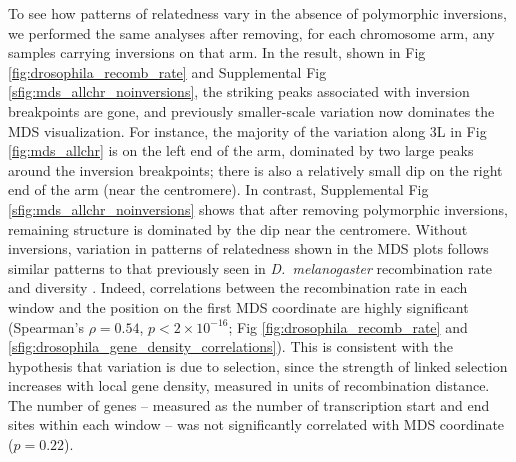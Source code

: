 \documentclass[11pt, oneside]{article}   	%
\newcommand\citep{\cite}
\newcommand{\Figure}{Fig }
\newcommand{\Figures}{Fig }
\newcommand{\Figure}{{Figure }}
\newcommand{\Figures}{{Figures }}
\begin{document}
To see how patterns of relatedness vary in the absence of polymorphic inversions,
we performed the same analyses after removing, for each chromosome arm,
any samples carrying inversions on that arm.
In the result, shown in \Figure \ref{fig:drosophila_recomb_rate} and
Supplemental \Figure \ref{sfig:mds_allchr_noinversions},
the striking peaks associated with inversion breakpoints are gone,
and previously smaller-scale variation now dominates the MDS visualization.
For instance, the majority of the variation along 3L in \Figure \ref{fig:mds_allchr}
is on the left end of the arm, dominated by two large peaks around the inversion breakpoints;
there is also a relatively small dip on the right end of the arm (near the centromere).
In contrast, Supplemental \Figure \ref{sfig:mds_allchr_noinversions} shows that after removing polymorphic inversions,
remaining structure is dominated by the dip near the centromere.
Without inversions, variation in patterns of relatedness shown in the MDS plots
follows similar patterns to that previously seen in \textit{D.~melanogaster} recombination rate and diversity \citep{langley2012genomic,mackay2012drosophila}.
Indeed, correlations between the recombination rate in each window and the position on the first MDS coordinate are highly significant
(Spearman's $\rho=0.54$, $p<2 \times 10^{-16}$; \Figures \ref{fig:drosophila_recomb_rate} and \ref{sfig:drosophila_gene_density_correlations}).
This is consistent with the hypothesis that variation
is due to selection, since the strength of linked selection increases with local gene density, 
measured in units of recombination distance.
The number of genes -- measured as the number of transcription start and end sites within each window --
was not significantly correlated with MDS coordinate ($p=0.22$).
\end{document}
